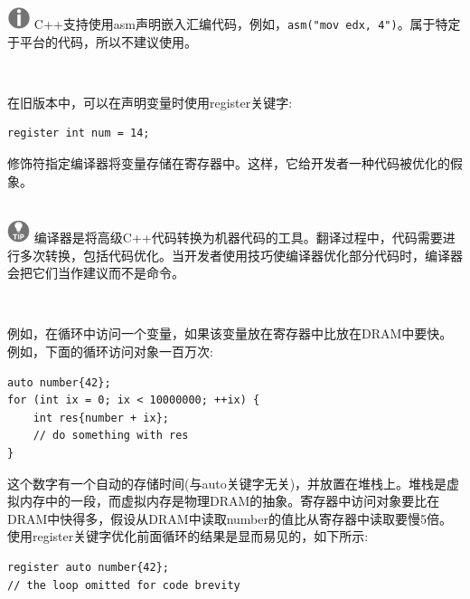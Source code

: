 \hspace*{\fill} \\ %
\includegraphics[width=0.05\textwidth]{images/warn}
C++支持使用asm声明嵌入汇编代码，例如，\texttt{asm("mov edx, 4")}。属于特定于平台的代码，所以不建议使用。\par
\noindent\textbf{}\ \par

在旧版本中，可以在声明变量时使用register关键字: \par

\begin{lstlisting}[caption={}]
register int num = 14;
\end{lstlisting}

修饰符指定编译器将变量存储在寄存器中。这样，它给开发者一种代码被优化的假象。 \par

\hspace*{\fill} \\ %
\includegraphics[width=0.05\textwidth]{images/tip}
编译器是将高级C++代码转换为机器代码的工具。翻译过程中，代码需要进行多次转换，包括代码优化。当开发者使用技巧使编译器优化部分代码时，编译器会把它们当作建议而不是命令。\par
\noindent\textbf{}\ \par

例如，在循环中访问一个变量，如果该变量放在寄存器中比放在DRAM中要快。例如，下面的循环访问对象一百万次: \par

\begin{lstlisting}[caption={}]
auto number{42};
for (int ix = 0; ix < 10000000; ++ix) {
	int res{number + ix};
	// do something with res
}
\end{lstlisting}

这个数字有一个自动的存储时间(与auto关键字无关)，并放置在堆栈上。堆栈是虚拟内存中的一段，而虚拟内存是物理DRAM的抽象。寄存器中访问对象要比在DRAM中快得多，假设从DRAM中读取number的值比从寄存器中读取要慢5倍。使用register关键字优化前面循环的结果是显而易见的，如下所示: \par

\begin{lstlisting}[caption={}]
register auto number{42};
// the loop omitted for code brevity
\end{lstlisting}

